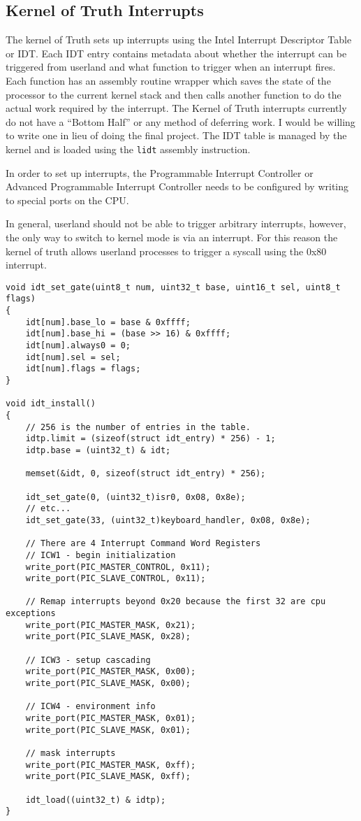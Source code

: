 \documentclass[10pt,conference,draftclsnofoot,onecolumn]{IEEEtran}
\begin{document}
\subsection{Kernel of Truth Interrupts}
The kernel of Truth sets up interrupts using the Intel Interrupt Descriptor Table or IDT. Each IDT entry contains metadata about whether the interrupt can be triggered from userland and what function to trigger when an interrupt fires. Each function has an assembly routine wrapper which saves the state of the processor to the current kernel stack and then calls another function to do the actual work required by the interrupt. The Kernel of Truth interrupts currently do not have a ``Bottom Half'' or any method of deferring work. I would be willing to write one in lieu of doing the final project. The IDT table is managed by the kernel and is loaded using the \texttt{lidt} assembly instruction.

In order to set up interrupts, the Programmable Interrupt Controller or Advanced Programmable Interrupt Controller needs to be configured by writing to special ports on the CPU.

In general, userland should not be able to trigger arbitrary interrupts, however, the only way to switch to kernel mode is via an interrupt. For this reason the kernel of truth allows userland processes to trigger a syscall using the 0x80 interrupt\cite{4_kronquist_2016}.

\begin{lstlisting}
void idt_set_gate(uint8_t num, uint32_t base, uint16_t sel, uint8_t flags)
{
    idt[num].base_lo = base & 0xffff;
    idt[num].base_hi = (base >> 16) & 0xffff;
    idt[num].always0 = 0;
    idt[num].sel = sel;
    idt[num].flags = flags;
}

void idt_install()
{
    // 256 is the number of entries in the table.
    idtp.limit = (sizeof(struct idt_entry) * 256) - 1;
    idtp.base = (uint32_t) & idt;

    memset(&idt, 0, sizeof(struct idt_entry) * 256);

    idt_set_gate(0, (uint32_t)isr0, 0x08, 0x8e);
    // etc...
    idt_set_gate(33, (uint32_t)keyboard_handler, 0x08, 0x8e);

    // There are 4 Interrupt Command Word Registers
    // ICW1 - begin initialization
    write_port(PIC_MASTER_CONTROL, 0x11);
    write_port(PIC_SLAVE_CONTROL, 0x11);

    // Remap interrupts beyond 0x20 because the first 32 are cpu exceptions
    write_port(PIC_MASTER_MASK, 0x21);
    write_port(PIC_SLAVE_MASK, 0x28);

    // ICW3 - setup cascading
    write_port(PIC_MASTER_MASK, 0x00);
    write_port(PIC_SLAVE_MASK, 0x00);

    // ICW4 - environment info
    write_port(PIC_MASTER_MASK, 0x01);
    write_port(PIC_SLAVE_MASK, 0x01);

    // mask interrupts
    write_port(PIC_MASTER_MASK, 0xff);
    write_port(PIC_SLAVE_MASK, 0xff);

    idt_load((uint32_t) & idtp);
}
\end{lstlisting}
\end{document}
